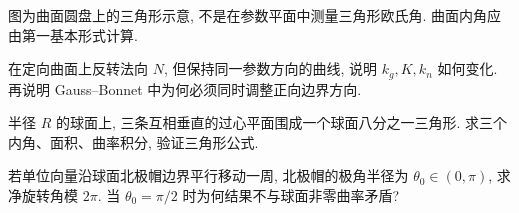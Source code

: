 \begin{center}
\end{center}
图为曲面圆盘上的三角形示意, 不是在参数平面中测量三角形欧氏角. 曲面内角应由第一基本形式计算.
\begin{exercise}\label{ex:10a}
在定向曲面上反转法向 $N$, 但保持同一参数方向的曲线, 说明 $k_g,K,k_n$ 如何变化. 再说明 Gauss--Bonnet 中为何必须同时调整正向边界方向.
\end{exercise}
\begin{exercise}\label{ex:10b}
半径 $R$ 的球面上, 三条互相垂直的过心平面围成一个球面八分之一三角形. 求三个内角、面积、曲率积分, 验证三角形公式.
\end{exercise}
\begin{exercise}\label{ex:10c}
若单位向量沿球面北极帽边界平行移动一周, 北极帽的极角半径为 $\theta_0\in(0,\pi)$, 求净旋转角模 $2\pi$. 当 $\theta_0=\pi/2$ 时为何结果不与球面非零曲率矛盾?
\end{exercise}
